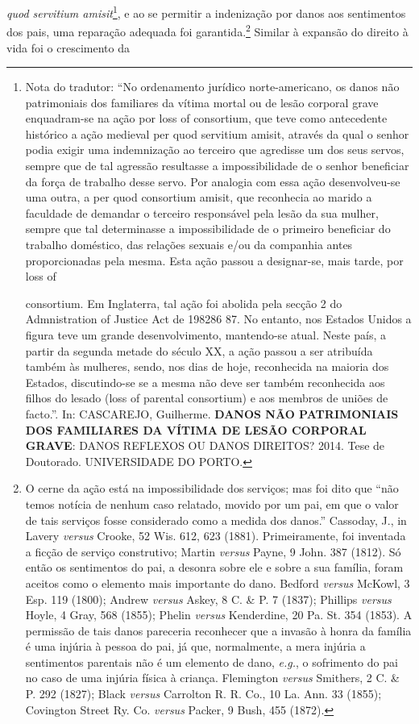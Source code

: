 \emph{quod servitium amisit}\footnote{Nota do tradutor: ``No ordenamento
  jurídico norte-americano, os danos não patrimoniais dos familiares da
  vítima mortal ou de lesão corporal grave enquadram-se na ação por loss
  of consortium, que teve como antecedente histórico a ação medieval per
  quod servitium amisit, através da qual o senhor podia exigir uma
  indemnização ao terceiro que agredisse um dos seus servos, sempre que
  de tal agressão resultasse a impossibilidade de o senhor beneficiar da
  força de trabalho desse servo. Por analogia com essa ação
  desenvolveu-se uma outra, a per quod consortium amisit, que reconhecia
  ao marido a faculdade de demandar o terceiro responsável pela lesão da
  sua mulher, sempre que tal determinasse a impossibilidade de o
  primeiro beneficiar do trabalho doméstico, das relações sexuais e/ou
  da companhia antes proporcionadas pela mesma. Esta ação passou a
  designar-se, mais tarde, por loss of

  consortium. Em Inglaterra, tal ação foi abolida pela secção 2 do
  Admnistration of Justice Act de 198286 87. No entanto, nos Estados
  Unidos a figura teve um grande desenvolvimento, mantendo-se atual.
  Neste país, a partir da segunda metade do século XX, a ação passou a
  ser atribuída também às mulheres, sendo, nos dias de hoje, reconhecida
  na maioria dos Estados, discutindo-se se a mesma não deve ser também
  reconhecida aos filhos do lesado (loss of parental consortium) e aos
  membros de uniões de facto.''. In: CASCAREJO, Guilherme. \textbf{DANOS
  NÃO PATRIMONIAIS DOS FAMILIARES DA VÍTIMA DE LESÃO CORPORAL GRAVE}:
  DANOS REFLEXOS OU DANOS DIREITOS? 2014. Tese de Doutorado.
  UNIVERSIDADE DO PORTO.}, e ao se permitir a indenização por danos aos
sentimentos dos pais, uma reparação adequada foi garantida.\footnote{O
  cerne da ação está na impossibilidade dos serviços; mas foi dito que
  ``não temos notícia de nenhum caso relatado, movido por um pai, em que
  o valor de tais serviços fosse considerado como a medida dos danos.''
  Cassoday, J., in Lavery \emph{versus} Crooke, 52 Wis. 612, 623 (1881).
  Primeiramente, foi inventada a ficção de serviço construtivo; Martin
  \emph{versus} Payne, 9 John. 387 (1812). Só então os sentimentos do
  pai, a desonra sobre ele e sobre a sua família, foram aceitos como o
  elemento mais importante do dano. Bedford \emph{versus} McKowl, 3 Esp.
  119 (1800); Andrew \emph{versus} Askey, 8 C. \& P. 7 (1837); Phillips
  \emph{versus} Hoyle, 4 Gray, 568 (1855); Phelin \emph{versus}
  Kenderdine, 20 Pa. St. 354 (1853). A permissão de tais danos pareceria
  reconhecer que a invasão à honra da família é uma injúria à pessoa do
  pai, já que, normalmente, a mera injúria a sentimentos parentais não é
  um elemento de dano, \emph{e.g.}, o sofrimento do pai no caso de uma
  injúria física à criança. Flemington \emph{versus} Smithers, 2 C. \&
  P. 292 (1827); Black \emph{versus} Carrolton R. R. Co., 10 La. Ann. 33
  (1855); Covington Street Ry. Co. \emph{versus} Packer, 9 Bush, 455
  (1872).} Similar à expansão do direito à vida foi o crescimento da
